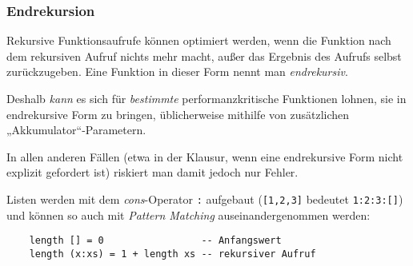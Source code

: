 \documentclass{beamer}
\begin{document}
\begin{frame}
  \frametitle{Endrekursion}
  Rekursive Funktionsaufrufe können optimiert werden,
  wenn die Funktion nach dem rekursiven Aufruf nichts mehr macht,
  außer das Ergebnis des Aufrufs selbst zurückzugeben.
  Eine Funktion in dieser Form nennt man \emph{endrekursiv}.
  
  Deshalb \emph{kann} es sich für \emph{bestimmte} performanzkritische Funktionen lohnen,
  sie in endrekursive Form zu bringen,
  üblicherweise mithilfe von zusätzlichen „Akkumulator“-Parametern.
  
  In allen anderen Fällen
  (etwa in der Klausur, wenn eine endrekursive Form nicht explizit gefordert ist)
  riskiert man damit jedoch nur Fehler.
\end{frame}

\begin{frame}[fragile]
  Listen werden mit dem \emph{cons}-Operator \lstinline{:} aufgebaut
  (\lstinline{[1,2,3]} bedeutet \lstinline{1:2:3:[]})
  und können so auch mit \emph{Pattern Matching} auseinandergenommen werden:
  
  \begin{lstlisting}
    length [] = 0                 -- Anfangswert
    length (x:xs) = 1 + length xs -- rekursiver Aufruf
  \end{lstlisting}
\end{frame}
\end{document}
